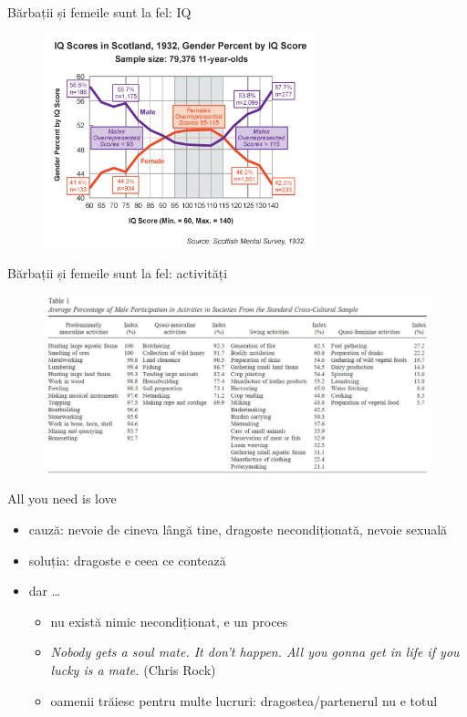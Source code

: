 \documentclass{simple}
\begin{document}
\begin{frame}{Bărbații și femeile sunt la fel: IQ}
  \centering
  \begin{figure}
    \includegraphics[width=0.7\textwidth]{img/male-female-iq}
  \end{figure}
\end{frame}

\begin{frame}{Bărbații și femeile sunt la fel: activități}
  \centering
  \begin{figure}
    \includegraphics[width=\textwidth]{img/male-activities}
  \end{figure}
\end{frame}

\begin{frame}{All you need is love}
  \begin{itemize}
    \pause \item cauză: nevoie de cineva lângă tine, dragoste necondiționată, nevoie sexuală
    \pause \item soluția: dragoste e ceea ce contează
    \pause \item dar \ldots
      \begin{itemize}
        \pause \item nu există nimic necondiționat, e un proces
        \pause \item \textit{Nobody gets a soul mate. It don't happen. All you gonna get in life if you lucky is a mate.} (Chris Rock)
        \pause \item oamenii trăiesc pentru multe lucruri: dragostea/partenerul nu e totul
      \end{itemize}
  \end{itemize}
\end{frame}
\end{document}
